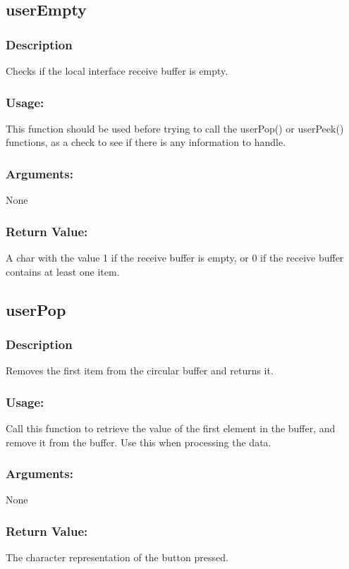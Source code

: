 \documentclass[]{report}
\begin{document}
\subsection{userEmpty}
\subsubsection{Description}
Checks if the local interface receive buffer is empty.
\subsubsection{Usage:}
This function should be used before trying to call the userPop()  or userPeek() functions, as a check to see if there is any information to handle. 

\subsubsection{Arguments:}
None
\subsubsection{Return Value:}
A char with the value 1 if the receive buffer is empty, or 0 if the receive buffer contains at least one item.

\subsection{userPop}
\subsubsection{Description}
Removes the first item from the circular buffer and returns it.
\subsubsection{Usage:}
Call this function to retrieve the value of the first element in the buffer, and remove it from the buffer. Use this when processing the data.

\subsubsection{Arguments:}
None
\subsubsection{Return Value:}
The character representation of the button pressed.
\end{document}
